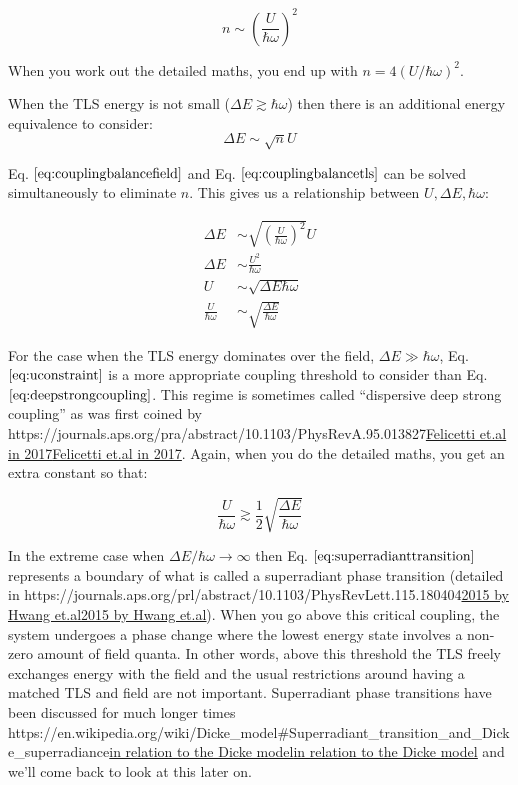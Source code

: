 \documentclass[
]{article}
\let\oldhref\href
\renewcommand{\href}[2]{\ifx#1\urlprefix\oldhref{#1}{#2}\else\uline{\oldhref{#1}{#2}}\fi}
\renewcommand{\[}{\begin{equation}}
\renewcommand{\]}{\end{equation}}
\begin{document}
\[
n \sim \left(\frac{U}{\hbar\omega}\right)^2
\label{eq:selfconsistentn}
\]

When you work out the detailed maths, you end up with
\(n = 4(U/\hbar\omega)^2\).

When the TLS energy is not small (\(\Delta E \gtrsim \hbar \omega\))
then there is an additional energy equivalence to consider: \[
\Delta E \sim \sqrt{n}U
\label{eq:couplingbalancetls}
\]

Eq. \(\ref{eq:couplingbalancefield}\) and Eq.
\(\ref{eq:couplingbalancetls}\) can be solved simultaneously to
eliminate \(n\). This gives us a relationship between
\(U,\Delta E,\hbar\omega\):

\[
\begin{aligned}
\Delta E &\sim \sqrt{\left(\frac{U}{\hbar\omega}\right)^2}U \\
\Delta E &\sim \frac{U^2}{\hbar\omega} \\
U &\sim \sqrt{\Delta E \hbar\omega} \\
\frac{U}{\hbar\omega} &\sim \sqrt{\frac{\Delta E}{\hbar\omega}}
\end{aligned}
\label{eq:uconstraint}
\]

For the case when the TLS energy dominates over the field,
\(\Delta E \gg \hbar \omega\), Eq. \(\ref{eq:uconstraint}\) is a more
appropriate coupling threshold to consider than Eq.
\(\ref{eq:deepstrongcoupling}\). This regime is sometimes called
``dispersive deep strong coupling'' as was first coined by
\href{https://journals.aps.org/pra/abstract/10.1103/PhysRevA.95.013827}{Felicetti
et.al in 2017}. Again, when you do the detailed maths, you get an extra
constant so that:

\[
\frac{U}{\hbar\omega} \gtrsim \frac{1}{2}\sqrt{\frac{\Delta E}{\hbar\omega}}
\label{eq:superradianttransition}
\]

In the extreme case when \(\Delta E/\hbar\omega \rightarrow \infty\)
then Eq. \(\ref{eq:superradianttransition}\) represents a boundary of
what is called a superradiant phase transition (detailed in
\href{https://journals.aps.org/prl/abstract/10.1103/PhysRevLett.115.180404}{2015
by Hwang et.al}). When you go above this critical coupling, the system
undergoes a phase change where the lowest energy state involves a
non-zero amount of field quanta. In other words, above this threshold
the TLS freely exchanges energy with the field and the usual
restrictions around having a matched TLS and field are not important.
Superradiant phase transitions have been discussed for much longer times
\href{https://en.wikipedia.org/wiki/Dicke_model\#Superradiant_transition_and_Dicke_superradiance}{in
relation to the Dicke model} and we'll come back to look at this later
on.
\end{document}
